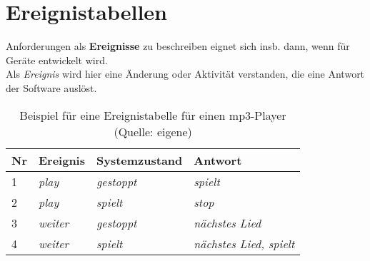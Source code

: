 \section{Ereignistabellen}
Anforderungen als \textbf{Ereignisse} zu beschreiben eignet sich insb. dann, wenn für Geräte entwickelt wird.\\

\noindent
Als \textit{Ereignis} wird hier eine Änderung oder Aktivität verstanden, die eine Antwort der Software auslöst.


\begin{table}
[htbp]
    \centering
    \begin{tabular}{|l|l|l|l|}
        \hline
        \textbf{Nr} & \textbf{Ereignis} & \textbf{Systemzustand} & \textbf{Antwort}   \\
        \hline
        1 & \textit{play} & \textit{gestoppt} & \textit{spielt}   \\
        \hline
        2 & \textit{play} & \textit{spielt} & \textit{stop}   \\
        \hline
        3 & \textit{weiter} & \textit{gestoppt} & \textit{nächstes Lied}   \\
        \hline
        4 & \textit{weiter} & \textit{spielt} & \textit{nächstes Lied, spielt}   \\
        \hline
    \end{tabular}
    \caption{Beispiel für eine Ereignistabelle für einen mp3-Player (Quelle: eigene)}\label{tab:ereignistabelle}
\end{table}

